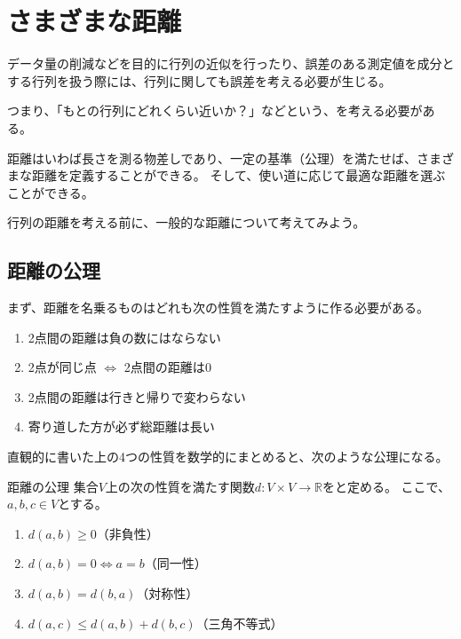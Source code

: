 \documentclass[../../../topic_linear-algebra]{subfiles}
\begin{document}
\sectionline
\section{さまざまな距離}

データ量の削減などを目的に行列の近似を行ったり、誤差のある測定値を成分とする行列を扱う際には、行列に関しても誤差を考える必要が生じる。

つまり、「もとの行列にどれくらい近いか？」などという、を考える必要がある。

\br

距離はいわば長さを測る物差しであり、一定の基準（公理）を満たせば、さまざまな距離を定義することができる。
そして、使い道に応じて最適な距離を選ぶことができる。

\br

行列の距離を考える前に、一般的な距離について考えてみよう。

\subsection{距離の公理}

まず、距離を名乗るものはどれも次の性質を満たすように作る必要がある。

\begin{enumerate}[label=\romanlabel]
  \item 2点間の距離は負の数にはならない
  \item 2点が同じ点 $\Longleftrightarrow$ 2点間の距離は$0$
  \item 2点間の距離は行きと帰りで変わらない
  \item 寄り道した方が必ず総距離は長い
\end{enumerate}

直観的に書いた上の4つの性質を数学的にまとめると、次のような公理になる。

\begin{definition}{距離の公理}
  集合$V$上の次の性質を満たす関数$d \colon V\times V \to \mathbb{R}$をと定める。
  ここで、$a,b,c \in V$とする。
  \begin{enumerate}[label=\romanlabel]
    \item $d(a,b) \geq 0$（非負性）
    \item $d(a,b) = 0 \Longleftrightarrow a = b$（同一性）
    \item $d(a,b) = d(b,a)$（対称性）
    \item $d(a,c) \leq d(a,b) + d(b,c)$（三角不等式）
  \end{enumerate}
\end{definition}
\end{document}
